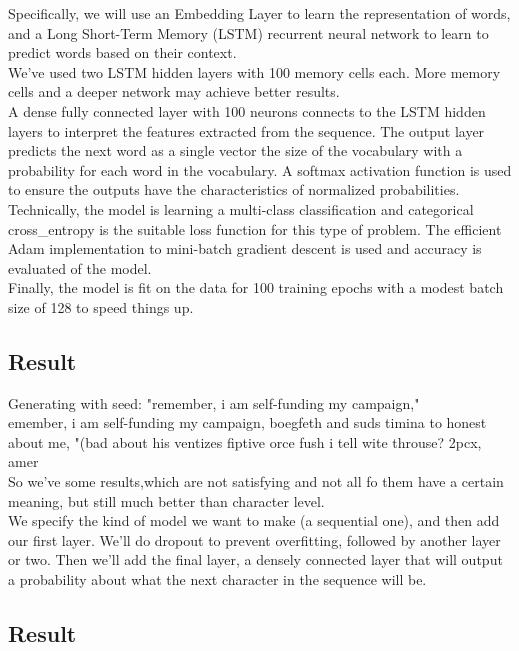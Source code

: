 \documentclass[conference]{IEEEtran}
\begin{document}
Specifically, we will use an Embedding Layer to learn the representation of words, and a Long Short-Term Memory (LSTM) recurrent neural network to learn to predict words based on their context.\\
We’ve used two LSTM hidden layers with 100 memory cells each. More memory cells and a deeper network may achieve better results.\\
A dense fully connected layer with 100 neurons connects to the LSTM hidden layers to interpret the features extracted from the sequence. The output layer predicts the next word as a single vector the size of the vocabulary with a probability for each word in the vocabulary. A softmax activation function is used to ensure the outputs have the characteristics of normalized probabilities.\\
Technically, the model is learning a multi-class classification and categorical cross\_entropy is the suitable loss function for this type of problem. The efficient Adam implementation to mini-batch gradient descent is used and accuracy is evaluated of the model.\\
Finally, the model is fit on the data for 100 training epochs with a modest batch size of 128 to speed things up.

\subsection{Result}

Generating with seed: "remember, i am self-funding my campaign,"\\

emember, i am self-funding my campaign, boegfeth and suds timina to honest about me, "(bad about his ventizes fiptive orce fush i tell wite throuse? 2pcx, amer\\

So we’ve some results,which are not satisfying and not all fo them have a certain meaning, but still much better than character level.\\

We specify the kind of model we want to make (a sequential one), and then add our first layer. We'll do dropout to prevent overfitting, followed by another layer or two. Then we'll add the final layer, a densely connected layer that will output a probability about what the next character in the sequence will be.\\

\subsection{Result}
\end{document}
